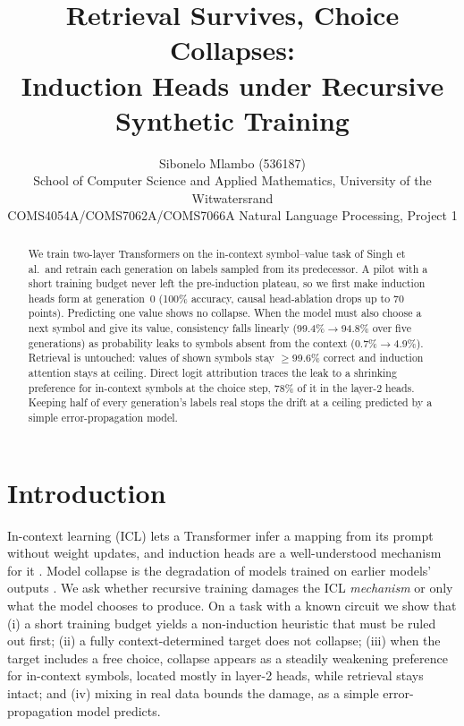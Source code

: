 \documentclass[10pt,a4paper]{article}
\title{\vspace{-0.6cm}\large\bfseries Retrieval Survives, Choice Collapses:\\
Induction Heads under Recursive Synthetic Training}
\author{\normalsize Sibonelo Mlambo (536187)\\
\small School of Computer Science and Applied Mathematics, University of the Witwatersrand\\
\small COMS4054A/COMS7062A/COMS7066A Natural Language Processing, Project 1}
\date{\vspace{-0.9cm}}
\begin{document}
\maketitle

\begin{abstract}
\noindent We train two-layer Transformers on the in-context symbol--value task of Singh et al.\ and retrain each generation on labels sampled from its predecessor. A pilot with a short training budget never left the pre-induction plateau, so we first make induction heads form at generation~0 (100\% accuracy, causal head-ablation drops up to 70 points). Predicting one value shows no collapse. When the model must also choose a next symbol and give its value, consistency falls linearly (99.4\%$\to$94.8\% over five generations) as probability leaks to symbols absent from the context (0.7\%$\to$4.9\%). Retrieval is untouched: values of shown symbols stay $\geq$99.6\% correct and induction attention stays at ceiling. Direct logit attribution traces the leak to a shrinking preference for in-context symbols at the choice step, 78\% of it in the layer-2 heads. Keeping half of every generation's labels real stops the drift at a ceiling predicted by a simple error-propagation model.
\end{abstract}

\section{Introduction}
In-context learning (ICL) lets a Transformer infer a mapping from its prompt without weight updates, and induction heads are a well-understood mechanism for it \citep{olsson2022,singh2024}. Model collapse is the degradation of models trained on earlier models' outputs \citep{shumailov2023,shumailov2024}. We ask whether recursive training damages the ICL \emph{mechanism} or only what the model chooses to produce. On a task with a known circuit we show that (i) a short training budget yields a non-induction heuristic that must be ruled out first; (ii) a fully context-determined target does not collapse; (iii) when the target includes a free choice, collapse appears as a steadily weakening preference for in-context symbols, located mostly in layer-2 heads, while retrieval stays intact; and (iv) mixing in real data bounds the damage, as a simple error-propagation model predicts.
\end{document}
